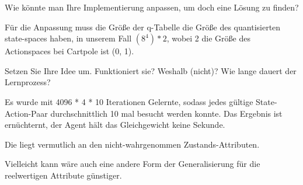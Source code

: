 \documentclass{ocbeameruni}
\begin{document}
\begin{frame}[3.2]
Wie könnte man Ihre Implementierung anpassen, um doch eine Lösung zu finden?

Für die Anpassung muss die Größe der q-Tabelle die Größe des quantisierten state-spaces haben,
in unserem Fall $(8^4)*2$, wobei 2 die Größe des Actionspaces bei Cartpole ist ({0, 1}).
\end{frame}

\begin{frame}[3.3]
Setzen Sie Ihre Idee um. Funktioniert sie? Weshalb (nicht)? Wie lange dauert der Lernprozess?

Es wurde mit 4096 * 4 * 10 Iterationen Gelernte, sodass jedes gültige 
State-Action-Paar durchschnittlich 10 mal besucht werden konnte. Das Ergebnis ist ernüchternt, der Agent
hält das Gleichgewicht keine Sekunde.

Die liegt vermutlich an den nicht-wahrgenommen Zustands-Attributen.

Vielleicht kann wäre auch eine andere Form der Generalisierung für die reelwertigen Attribute günstiger.
\end{frame}
\end{document}
